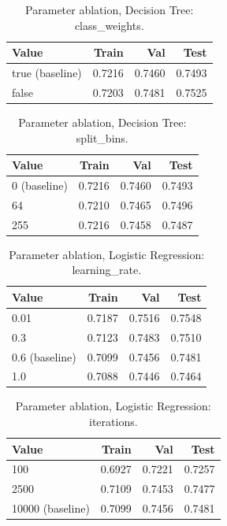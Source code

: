 \begin{table}[ht]
\centering
\small
\caption{Parameter ablation, Decision Tree: class\_weights.}
\label{tab:ablation-tree-class-weights}
\begin{tabular}{lrrr}
\toprule
Value & Train & Val & Test \\
\midrule
true (baseline) & 0.7216 & 0.7460 & 0.7493 \\
false & 0.7203 & 0.7481 & 0.7525 \\
\bottomrule
\end{tabular}
\end{table}

\begin{table}[ht]
\centering
\small
\caption{Parameter ablation, Decision Tree: split\_bins.}
\label{tab:ablation-tree-split-bins}
\begin{tabular}{lrrr}
\toprule
Value & Train & Val & Test \\
\midrule
0 (baseline) & 0.7216 & 0.7460 & 0.7493 \\
64 & 0.7210 & 0.7465 & 0.7496 \\
255 & 0.7216 & 0.7458 & 0.7487 \\
\bottomrule
\end{tabular}
\end{table}

\begin{table}[ht]
\centering
\small
\caption{Parameter ablation, Logistic Regression: learning\_rate.}
\label{tab:ablation-logistic-learning-rate}
\begin{tabular}{lrrr}
\toprule
Value & Train & Val & Test \\
\midrule
0.01 & 0.7187 & 0.7516 & 0.7548 \\
0.3 & 0.7123 & 0.7483 & 0.7510 \\
0.6 (baseline) & 0.7099 & 0.7456 & 0.7481 \\
1.0 & 0.7088 & 0.7446 & 0.7464 \\
\bottomrule
\end{tabular}
\end{table}

\begin{table}[ht]
\centering
\small
\caption{Parameter ablation, Logistic Regression: iterations.}
\label{tab:ablation-logistic-iterations}
\begin{tabular}{lrrr}
\toprule
Value & Train & Val & Test \\
\midrule
100 & 0.6927 & 0.7221 & 0.7257 \\
2500 & 0.7109 & 0.7453 & 0.7477 \\
10000 (baseline) & 0.7099 & 0.7456 & 0.7481 \\
\bottomrule
\end{tabular}
\end{table}

